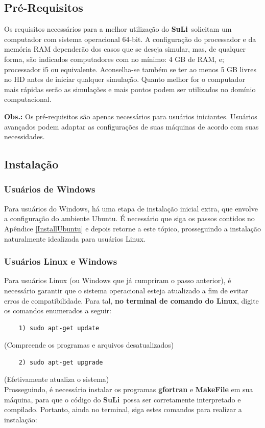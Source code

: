 \documentclass[12pt, a4paper]{article}
\newcommand{\SL}{{\bf SuLi}}
\begin{document}
\subsection{Pré-Requisitos}
Os requisitos necessários para a melhor utilização do \SL\ solicitam um computador com sistema operacional 64-bit. A configuração do processador e da memória RAM dependerão dos casos que se deseja simular, mas, de qualquer forma, são indicados computadores com no mínimo: 4 GB de RAM, e; processador i5 ou equivalente. Aconselha-se também se ter ao menos 5 GB livres no HD antes de iniciar qualquer simulação. Quanto melhor for o computador mais rápidas serão as simulações e mais pontos podem ser utilizados no domínio computacional. 

\textbf{Obs.:} Os pré-requisitos são apenas necessários para usuários iniciantes. Usuários avançados podem adaptar as configurações de suas máquinas de acordo com suas necessidades.

\subsection{Instalação}
\subsubsection{Usuários de Windows}	\label{WindowsUsers}
Para usuários do Windows, há uma etapa de instalação inicial extra, que envolve a configuração do ambiente Ubuntu. É necessário que siga os passos contidos no Apêndice \ref{InstallUbuntu} e depois retorne a este tópico, prosseguindo a instalação naturalmente idealizada para usuários Linux.

\subsubsection{Usuários Linux e Windows}  \label{ContinueInstall}
Para usuários Linux (ou Windows que já cumpriram o passo anterior), é necessário garantir que o sistema operacional esteja atualizado a fim de evitar erros de compatibilidade. Para tal, \textbf{no terminal de comando do Linux}, digite os comandos enumerados a seguir:

\begin{verbatim}
	1) sudo apt-get update
\end{verbatim}
(Compreende os programas e arquivos desatualizados)

\begin{verbatim}
	2) sudo apt-get upgrade
\end{verbatim}
(Efetivamente atualiza o sistema)
\\
Prosseguindo, é necessário instalar os programas {\bf gfortran} e {\bf MakeFile} em sua máquina, para que o código do \SL\ possa ser corretamente interpretado e compilado. Portanto, ainda no terminal, siga estes comandos para realizar a instalação:
\end{document}
